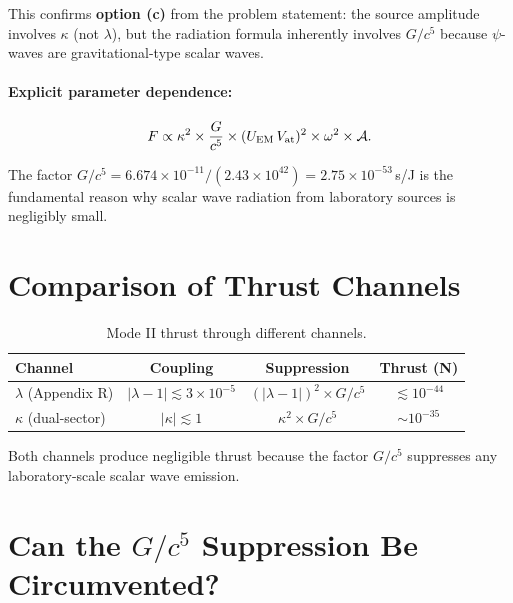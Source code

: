 \documentclass[11pt]{article}
\begin{document}
This confirms \textbf{option (c)} from the problem statement: the source
amplitude involves $\kappa$ (not $\lambda$), but the radiation formula
inherently involves $G/c^5$ because $\psi$-waves are gravitational-type
scalar waves.

\paragraph{Explicit parameter dependence:}
\begin{equation}
F \propto \kappa^2 \times \frac{G}{c^5} \times (U_{\rm EM}\,V_{\rm at})^2
  \times \omega^2 \times \mathcal{A}.
\end{equation}

The factor $G/c^5 = 6.674 \times 10^{-11}/(2.43 \times 10^{42})
= 2.75 \times 10^{-53}$\,s/J is the fundamental reason why scalar wave
radiation from laboratory sources is negligibly small.

\section{Comparison of Thrust Channels}\label{sec:comparison}

\begin{table}[h]
\centering
\caption{Mode II thrust through different channels.}\label{tab:channels}
\begin{tabular}{lccc}
\toprule
Channel & Coupling & Suppression & Thrust (N) \\
\midrule
$\lambda$ (Appendix R) & $|\lambda-1| \lesssim 3\times10^{-5}$ & $(|\lambda-1|)^2 \times G/c^5$ & $\lesssim 10^{-44}$ \\
$\kappa$ (dual-sector) & $|\kappa| \lesssim 1$ & $\kappa^2 \times G/c^5$ & $\sim 10^{-35}$ \\
\bottomrule
\end{tabular}
\end{table}

Both channels produce negligible thrust because the factor $G/c^5$
suppresses any laboratory-scale scalar wave emission.

\section{Can the $G/c^5$ Suppression Be Circumvented?}\label{sec:circumvent}
\end{document}
